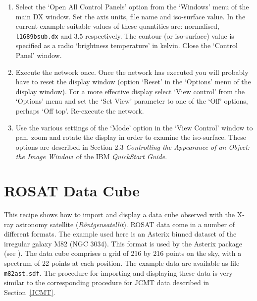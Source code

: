 \documentclass[twoside,11pt]{starlink}
\begin{document}
\begin{enumerate}
  \begin{enumerate}

    \item Select the `Open All Control Panels' option from the `Windows'
     menu of the main DX window.  Set the axis units, file name
     and iso-surface value.  In the current example suitable
     values of these quantities are: normalised, \texttt{l1689bsub.dx} and
     3.5 respectively.
     The contour (or iso-surface) value is specified as a radio
     `brightness temperature' in kelvin.  Close the `Control
     Panel' window.

    \item Execute the network once.  Once the network has executed you
     will probably have to reset the display window (option `Reset' in
     the `Options' menu of the display window).  For a more effective
     display select `View control' from the `Options' menu and set the
     `Set View' parameter to one of the `Off' options, perhaps `Off top'.
     Re-execute the network.

    \item Use the various settings of the `Mode' option in the `View
     Control' window to pan, zoom and rotate the display in order to
     examine the iso-surface.  These options are described in Section
     2.3 \textit{Controlling the Appearance of an Object: the Image
     Window}\, of the IBM \textit{QuickStart Guide}\cite{QUICKS}.

  \end{enumerate}

\end{enumerate}


\newpage
\section{\label{ROSAT}ROSAT Data Cube}

This recipe shows how to import and display a data cube observed with the
X-ray astronomy satellite (\textit{R\"{o}ntgensatellit}).  ROSAT data come
in a number of different formats.  The example used here is an Asterix
binned dataset of the irregular galaxy M82 (NGC 3034).  This format is
used by the Asterix package (see \cite{SUN98}).
The data cube comprises a grid of 216 by 216 points on the sky, with a
spectrum of 22 points at each position.  The example data are available
as file \texttt{m82ast.sdf}.  The procedure for importing and displaying these
data is very similar to the corresponding procedure for JCMT data
described in Section~\ref{JCMT}.
\end{document}
